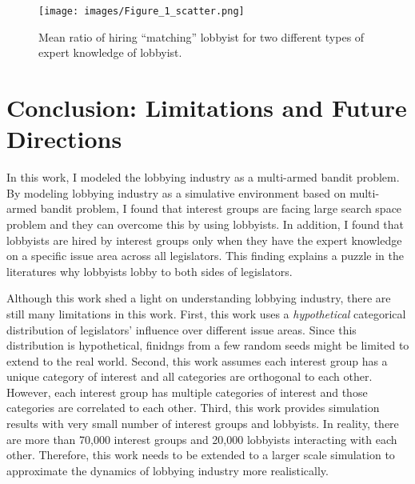 \documentclass{article}
\begin{document}
\begin{figure}[h!]
    \centering
    \texttt{[image: images/Figure\_1\_scatter.png]}
    \caption{Mean ratio of hiring ``matching'' lobbyist for two different types of expert knowledge of lobbyist.}
    \label{fig:specialization}
\end{figure}

\section{Conclusion: Limitations and Future Directions}

In this work, 
I modeled the lobbying industry as a multi-armed bandit problem.
By modeling lobbying industry as a simulative environment based on 
multi-armed bandit problem, I found that 
interest groups are facing large search space problem 
and they can overcome this by using lobbyists.
In addition, I found that lobbyists are hired 
by interest groups 
only when they have the expert knowledge on a specific issue area across all legislators.
This finding explains a puzzle in the literatures why lobbyists lobby to both sides of legislators.

Although this work shed a light on understanding lobbying industry, 
there are still many limitations in this work. First, this work 
uses a \textit{hypothetical} categorical distribution of 
legislators' influence over different issue areas.
Since this distribution is hypothetical,
finidngs from a few random seeds might be limited to 
extend to the real world.
Second, this work assumes each interest group has a unique 
category of interest and all categories are orthogonal to each other.
However, each 
interest group has multiple categories of interest and 
those categories are correlated to each other. 
Third, this work provides simulation results with 
very small number of interest groups and lobbyists. In reality,
there are more than 70,000 interest groups and 20,000 lobbyists interacting with each other.
Therefore, this work needs to be extended to a larger scale simulation 
to approximate the dynamics of lobbying industry more realistically.
\end{document}

